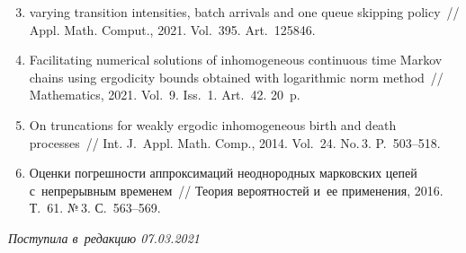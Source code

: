 \begin{multicols}{2}

{\small 
\begin{enumerate}[1.]
\setcounter{enumi}{2}

\item[{}]
varying
 transition intensities, 
batch arrivals and one queue skipping policy~// Appl. Math. Comput., 2021. Vol.~395. Art.~125846.
{ %

}

\item
{} 
Facilitating numerical solutions of inhomogeneous continuous time Markov chains 
using ergodicity bounds obtained with logarithmic norm method~// Mathematics, 2021. Vol.~9. Iss.~1. 
Art.~42. 20~p.


\columnbreak

\item
{} 
On truncations for weakly ergodic inhomogeneous birth and death processes~// Int. J.~Appl. Math. 
Comp., 2014. Vol.~24. No.\,3. P.~503--518.\\[-14pt]

\item
{}
Оценки погрешности аппроксимаций неоднородных марковских цепей с~непрерывным временем~//
 Теория вероятностей и~ее применения, 2016. Т.~61. №\,3. С.~563--569.
\end{enumerate}
}
 
 
 

\end{multicols}

\vspace*{-9pt}

\hfill{\small\textit{Поступила в~редакцию 07.03.2021}}



\newpage

\vspace*{-28pt}





